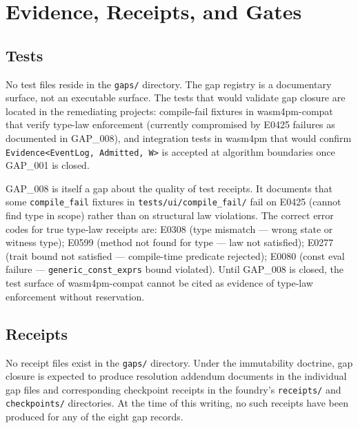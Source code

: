 
\section{Evidence, Receipts, and Gates}
\label{sec:gaps-evidence}

\subsection{Tests}
\label{sec:gaps-evidence-tests}

No test files reside in the \texttt{gaps/} directory. The gap registry is a documentary
surface, not an executable surface. The tests that would validate gap closure are
located in the remediating projects: compile-fail fixtures in wasm4pm-compat that verify
type-law enforcement (currently compromised by E0425 failures as documented in GAP\_008),
and integration tests in wasm4pm that would confirm \texttt{Evidence<EventLog, Admitted, W>}
is accepted at algorithm boundaries once GAP\_001 is closed.

GAP\_008 is itself a gap about the quality of test receipts. It documents that some
\texttt{compile\_fail} fixtures in \texttt{tests/ui/compile\_fail/} fail on E0425 (cannot
find type in scope) rather than on structural law violations. The correct error codes for
true type-law receipts are: E0308 (type mismatch — wrong state or witness type); E0599
(method not found for type — law not satisfied); E0277 (trait bound not satisfied —
compile-time predicate rejected); E0080 (const eval failure — \texttt{generic\_const\_exprs}
bound violated). Until GAP\_008 is closed, the test surface of wasm4pm-compat cannot
be cited as evidence of type-law enforcement without reservation.

\subsection{Receipts}
\label{sec:gaps-evidence-receipts}

No receipt files exist in the \texttt{gaps/} directory. Under the immutability doctrine,
gap closure is expected to produce resolution addendum documents in the individual gap
files and corresponding checkpoint receipts in the foundry's \texttt{receipts/} and
\texttt{checkpoints/} directories. At the time of this writing, no such receipts have
been produced for any of the eight gap records.

